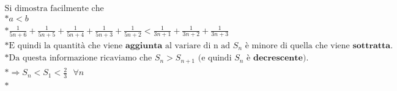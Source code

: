 \documentclass{article}
\begin{document}
\begin{gather*}
\text{Si dimostra facilmente che}\\*
a < b\\*
\frac{1}{5n+6} + \frac{1}{5n+5} + \frac{1}{5n+4} + \frac{1}{5n+3} + \frac{1}{5n+2} < \frac{1}{3n+1} + \frac{1}{3n+2} + \frac{1}{3n+3}\\*
\text{E quindi la quantità che viene } \textbf{aggiunta} \text{ al variare di n ad } S_n \text{ è minore di quella che viene } \textbf{sottratta.}\\*
\text{Da questa informazione ricaviamo che } S_n > S_{n+1} \text{ (e quindi } S_n \text{ è } \textbf{decrescente} \text{).}\\*
\Rightarrow S_n < S_1 < \frac{2}{3} \text{ } \forall n\\*
\end{gather*}
\end{document}
